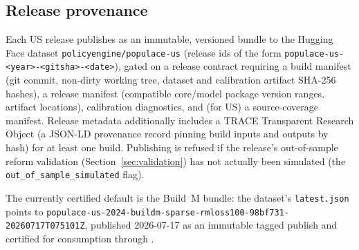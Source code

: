 \subsection{Release provenance}
\label{sec:release-provenance}

Each \microcosm{} US release publishes as an immutable, versioned bundle to
the Hugging Face dataset \texttt{policyengine/populace-us}
(release ids of the form \texttt{populace-us-<year>-<gitsha>-<date>}), gated
on a release contract requiring a build manifest (git commit, non-dirty
working tree, dataset and calibration artifact SHA-256 hashes), a release
manifest (compatible core/model package version ranges, artifact locations),
calibration diagnostics, and (for US) a source-coverage manifest. Release
metadata additionally includes a TRACE Transparent Research Object (a
JSON-LD provenance record pinning build inputs and outputs by hash) for at
least one build.
 Publishing is refused
if the release's out-of-sample reform validation (Section~\ref{sec:validation})
has not actually been simulated (the \texttt{out\_of\_sample\_simulated}
flag).

The currently certified default is the Build~M bundle: the dataset's
\texttt{latest.json} points to
\texttt{populace-us-2024-buildm-sparse-rmloss100-98bf731-20260717T075101Z},
published 2026-07-17 as an immutable tagged publish and certified for
consumption through \policyenginepy{}.

